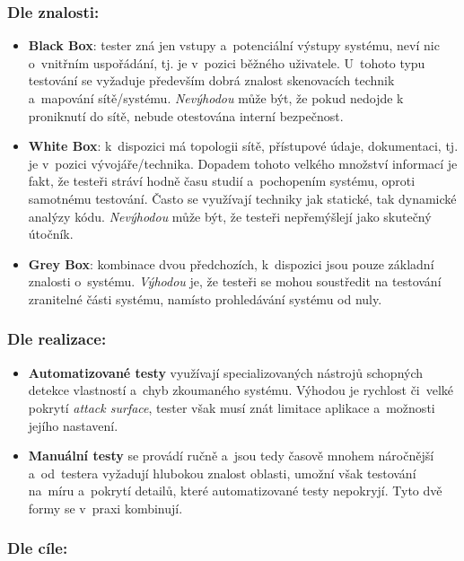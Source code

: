 \subsubsection*{Dle znalosti:}

\begin{itemize}
    \item \textbf{Black Box}: tester zná jen vstupy a~potenciální výstupy systému, neví nic o~vnitřním uspořádání, tj. je v~pozici běžného uživatele. U~tohoto typu testování se vyžaduje především dobrá znalost skenovacích technik a~mapování sítě/systému. \textit{Nevýhodou} může být, že pokud nedojde k proniknutí do sítě, nebude otestována interní bezpečnost.

    \item \textbf{White Box}: k~dispozici má topologii sítě, přístupové údaje, dokumentaci, tj. je v~pozici vývojáře/technika. Dopadem tohoto velkého množství informací je fakt, že testeři stráví hodně času studií a~pochopením systému, oproti samotnému testování. Často se využívají techniky jak statické, tak dynamické analýzy kódu. \textit{Nevýhodou} může být, že testeři nepřemýšlejí jako skutečný útočník.

    \item \textbf{Grey Box}: kombinace dvou předchozích, k~dispozici jsou pouze základní znalosti o~systému. \textit{Výhodou} je, že testeři se mohou soustředit na testování zranitelné části systému, namísto prohledávání systému od nuly.
\end{itemize}

\subsubsection*{Dle realizace:}

\begin{itemize}
    \item \textbf{Automatizované testy} využívají specializovaných nástrojů schopných detekce vlastností a~chyb zkoumaného systému. Výhodou je rychlost či~velké pokrytí \emph{attack surface}, tester však musí znát limitace aplikace a~možnosti jejího nastavení.

    \item \textbf{Manuální testy} se provádí ručně a~jsou tedy časově mnohem náročnější a~od~testera vyžadují hlubokou znalost oblasti, umožní však testování na~míru a~pokrytí detailů, které automatizované testy nepokryjí. Tyto dvě formy se v~praxi kombinují.
\end{itemize}
\subsubsection*{Dle cíle:}

